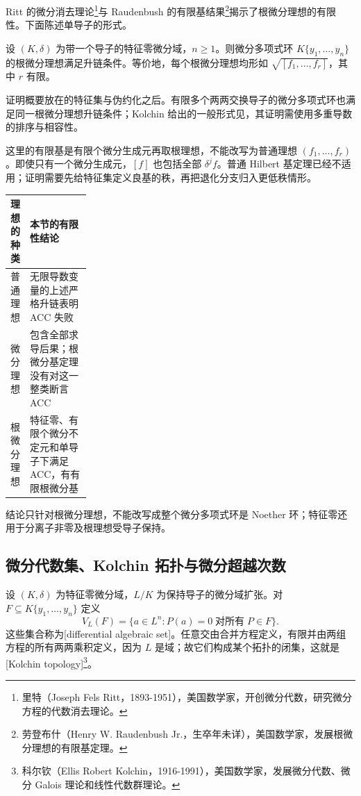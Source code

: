 Ritt 的微分消去理论\footnote{里特（Joseph Fels Ritt，1893-1951），美国数学家，开创微分代数，研究微分方程的代数消去理论。}与 Raudenbush 的有限基结果\footnote{劳登布什（Henry W. Raudenbush Jr.，生卒年未详），美国数学家，发展根微分理想的有限基定理。}揭示了根微分理想的有限性。下面陈述单导子的形式。

\begin{theorem}\label{b3:thm:ritt-raudenbush}
	设 \((K,\delta)\) 为带一个导子的特征零微分域，\(n\ge1\)。则微分多项式环 \(K\{y_1,\ldots,y_n\}\) 的根微分理想满足升链条件。等价地，每个根微分理想均形如 \(\sqrt{[f_1,\ldots,f_r]}\)，其中 \(r\) 有限。
\end{theorem}

证明概要放在的特征集与伪约化之后。有限多个两两交换导子的微分多项式环也满足同一根微分理想升链条件；Kolchin 给出的一般形式见\cite[Section 2.2, Theorem 2.4]{Hubert2003DifferentialSystems}，其证明需使用多重导数的排序与相容性。

这里的有限基是有限个微分生成元再取根理想，不能改写为普通理想 \((f_1,\ldots,f_r)\)。即使只有一个微分生成元，\([f]\) 也包括全部 \(\delta^jf\)。普通 Hilbert 基定理已经不适用；证明需要先给特征集定义良基的秩，再把退化分支归入更低秩情形。
\begin{center}
	\begin{tabularx}{\linewidth}{@{}>{\raggedright\arraybackslash}p{0.23\linewidth}X@{}}
		\toprule
		理想的种类 & 本节的有限性结论 \\
		\midrule
		普通理想 & 无限导数变量的上述严格升链表明 ACC 失败 \\
		微分理想 & 包含全部求导后果；根微分基定理没有对这一整类断言 ACC \\
		根微分理想 & 特征零、有限个微分不定元和单导子下满足 ACC，有有限根微分基 \\
		\bottomrule
	\end{tabularx}
\end{center}

结论只针对根微分理想，不能改写成整个微分多项式环是 Noether 环；特征零还用于分离子非零及根理想受导子保持。

\subsection{微分代数集、Kolchin 拓扑与微分超越次数}
\label{b3:subsec:E02:02}

设 \((K,\delta)\) 为特征零微分域，\(L/K\) 为保持导子的微分域扩张。对 \(F\subseteq K\{y_1,\ldots,y_n\}\) 定义
\[
	V_L(F)=\{a\in L^n:P(a)=0\;\text{对所有}\;P\in F\}.
\]
这些集合称为[differential algebraic set]。任意交由合并方程定义，有限并由两组方程的所有两两乘积定义，因为 \(L\) 是域；故它们构成某个拓扑的闭集，这就是[Kolchin topology]\footnote{科尔钦（Ellis Robert Kolchin，1916-1991），美国数学家，发展微分代数、微分 Galois 理论和线性代数群理论。}。

